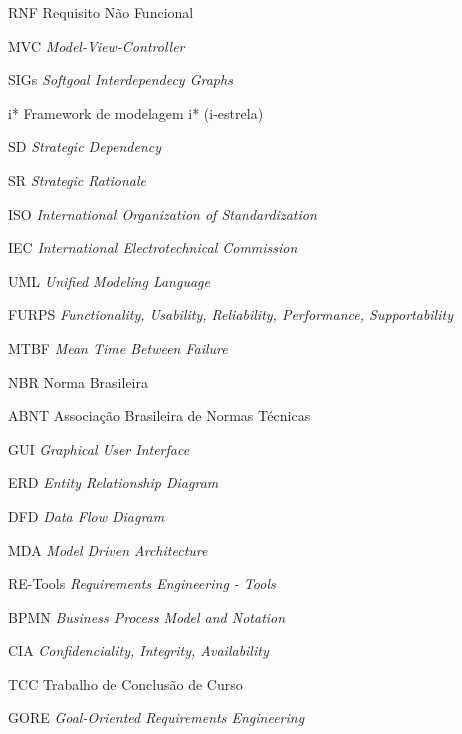 \begin{siglas}
  \item[RNF] Requisito Não Funcional
  \item[MVC] \textit{Model-View-Controller}
  \item[SIGs] \textit{Softgoal Interdependecy Graphs}
  \item[i*] Framework de modelagem i* (i-estrela)
  \item[SD] \textit{Strategic Dependency}
  \item[SR] \textit{Strategic Rationale}
  \item[ISO] \textit{International Organization of Standardization}
  \item[IEC] \textit{International Electrotechnical Commission}
  \item[UML] \textit{Unified Modeling Language}
  \item[FURPS] \textit{Functionality, Usability, Reliability, Performance, Supportability}
  \item[MTBF] \textit{Mean Time Between Failure}
  \item[NBR] Norma Brasileira
  \item[ABNT] Associação Brasileira de Normas Técnicas
  \item[GUI] \textit{Graphical User Interface}
  \item[ERD] \textit{Entity Relationship Diagram}
  \item[DFD] \textit{Data Flow Diagram}
  \item[MDA] \textit{Model Driven Architecture}
  \item[RE-Tools] \textit{Requirements Engineering - Tools}
  \item[BPMN] \textit{Business Process Model and Notation}
  \item[CIA] \textit{Confidenciality, Integrity, Availability}
  \item[TCC] Trabalho de Conclusão de Curso
  \item[GORE] \textit{Goal-Oriented Requirements Engineering}
\end{siglas}
